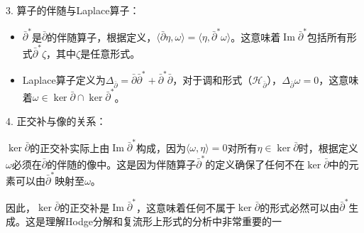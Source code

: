 \documentclass[lang=cn,zihao=-4,a4paper,fontset=none]{beautybook}
\begin{document}
3. 算子的伴随与Laplace算子：
\begin{itemize}
   \item $\bar{\partial}^*$是$\bar{\partial}$的伴随算子，根据定义，$\langle \bar{\partial} \eta, \omega \rangle = \langle \eta, \bar{\partial}^* \omega \rangle$。这意味着$\operatorname{Im} \bar{\partial}^*$包括所有形式$\bar{\partial}^* \zeta$，其中$\zeta$是任意形式。
   \item Laplace算子定义为$\Delta_{\bar{\partial}} = \bar{\partial}\bar{\partial}^* + \bar{\partial}^*\bar{\partial}$，对于调和形式（$\mathcal{H}_{\bar{\partial}}$），$\Delta_{\bar{\partial}} \omega = 0$，这意味着$\omega \in \ker \bar{\partial} \cap \ker \bar{\partial}^*$。
\end{itemize}

4. 正交补与像的关系：

    $\ker \bar{\partial}$的正交补实际上由$\operatorname{Im} \bar{\partial}^*$构成，因为$\langle \omega, \eta \rangle = 0$对所有$\eta \in \ker \bar{\partial}$时，根据定义$\omega$必须在$\bar{\partial}$的伴随的像中。这是因为伴随算子$\bar{\partial}^*$的定义确保了任何不在$\ker \bar{\partial}$中的元素可以由$\bar{\partial}^*$映射至$\omega$。

因此，$\ker \bar{\partial}$的正交补是$\operatorname{Im} \bar{\partial}^*$，这意味着任何不属于$\ker \bar{\partial}$的形式必然可以由$\bar{\partial}^*$生成。这是理解Hodge分解和复流形上形式的分析中非常重要的一
\end{document}
